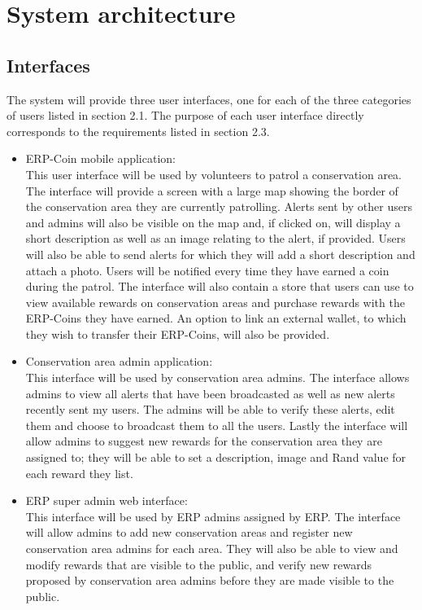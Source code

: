 \documentclass{article}
\begin{document}
\section{System architecture}

\subsection{Interfaces}
 
\def\sectionautorefname{UI}
The system will provide three user interfaces, one for each of the three categories of users listed in section 2.1. The purpose of each user interface directly corresponds to the requirements listed in section 2.3.

\begin{itemize}
\item ERP-Coin mobile application:\\
This user interface will be used by volunteers to patrol a conservation area. The interface will provide a screen with a large map showing the border of the conservation area they are currently patrolling. Alerts sent by other users and admins will also be visible on the map and, if clicked on, will display a short description as well as an image relating to the alert, if provided. Users will also be able to send alerts for which they will add a short description and attach a photo. Users will be notified every time they have earned a coin during the patrol. The interface will also contain a store that users can use to view available rewards on conservation areas and purchase rewards with the ERP-Coins they have earned. An option to link an external wallet, to which they wish to transfer their ERP-Coins, will also be provided.

\item Conservation area admin application:\\
This interface will be used by conservation area admins. The interface allows admins to view all alerts that have been broadcasted as well as new alerts recently sent my users. The admins will be able to verify these alerts, edit them and choose to broadcast them to all the users. Lastly the interface will allow admins to suggest new rewards for the conservation area they are assigned to; they will be able to set a description, image and Rand value for each reward they list.

\item ERP super admin web interface:\\
This interface will be used by ERP admins assigned by ERP. The interface will allow admins to add new conservation areas and register new conservation area admins for each area. They will also be able to view and modify rewards that are visible to the public, and verify new rewards proposed by conservation area admins before they are made visible to the public.
\end{itemize}
\end{document}
